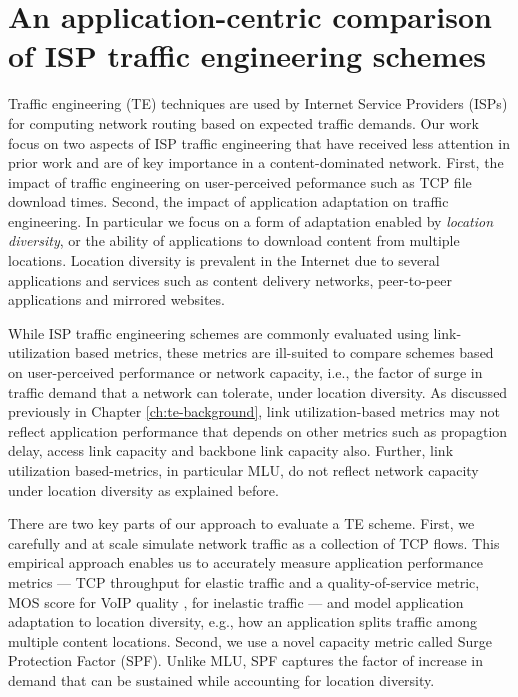 \chapter{An application-centric comparison of ISP traffic engineering schemes}
\label{ch:beyondmlu}

Traffic engineering (TE) techniques are used by Internet Service Providers (ISPs) for computing network routing based on expected traffic demands. Our work focus on two aspects of ISP traffic engineering that have received less attention in prior work and are of key importance in a content-dominated network. First, the impact of traffic engineering on user-perceived peformance such as TCP file download times. Second, the impact of application adaptation on traffic engineering. In particular we focus on a form of adaptation enabled by \emph{location diversity}, or the ability of applications to download content from multiple locations. Location diversity is prevalent in the Internet due to several applications and services such as content delivery networks, peer-to-peer applications and mirrored websites.

While ISP traffic engineering schemes are commonly evaluated using link-utilization based metrics, these metrics are ill-suited to compare schemes based on user-perceived performance or network capacity, i.e., the factor of surge in traffic demand that a network can tolerate, under location diversity. As discussed previously in Chapter \ref{ch:te-background}, link utilization-based metrics may not reflect application performance that depends on other metrics such as propagtion delay, access link capacity and backbone link capacity also. Further, link utilization based-metrics, in particular MLU, do not reflect network capacity under location diversity as explained before. 

There are two key parts of our approach to evaluate a TE scheme. First, we carefully and at scale simulate network traffic as a collection of TCP flows. This empirical approach  enables us to accurately measure application performance metrics --- TCP throughput for elastic traffic and a quality-of-service metric,  MOS score for VoIP quality \cite{MOS-formula}, for inelastic traffic --- and model application adaptation to location diversity, e.g., how an application splits traffic among multiple content locations. Second, we use a novel capacity metric called Surge Protection Factor (SPF). Unlike MLU, SPF captures the factor of increase in demand that can be sustained while accounting for location diversity.

